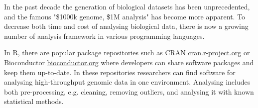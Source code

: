 

%





In the past decade the generation of biological datasets has been unprecedented,
and the famous "\$1000k genome, \$1M analysis"\cite{} has become more apparent.
To decrease both time and cost of analysing biological data, there is now a
growing number of analysis framework in various programming languages.\cite{}

In R, there are popular package repositories such as CRAN
\url{cran.r-project.org} or Bioconductor \url{bioconductor.org} where developers
can share software packages and keep them up-to-date. In these repositories
researchers can find software for analysing high-throughput genomic data in one
environment. Analysing includes both pre-processing, e.g. cleaning, removing
outliers, and analysing it with known statistical methods.

